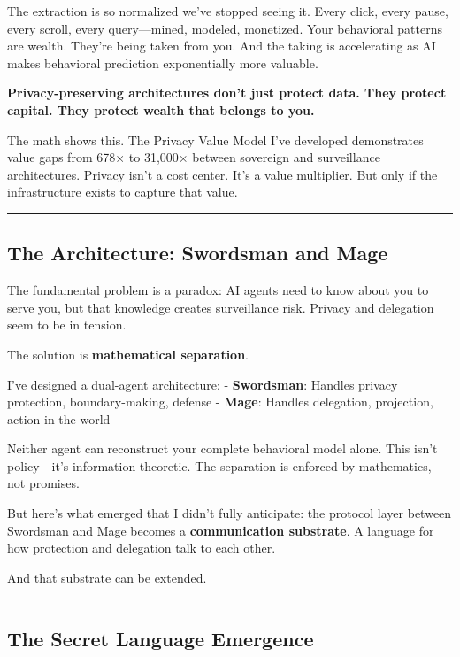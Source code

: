 \documentclass[
]{article}
\begin{document}
The extraction is so normalized we've stopped seeing it. Every click,
every pause, every scroll, every query---mined, modeled, monetized. Your
behavioral patterns are wealth. They're being taken from you. And the
taking is accelerating as AI makes behavioral prediction exponentially
more valuable.

\textbf{Privacy-preserving architectures don't just protect data. They
protect capital. They protect wealth that belongs to you.}

The math shows this. The Privacy Value Model I've developed demonstrates
value gaps from 678× to 31,000× between sovereign and surveillance
architectures. Privacy isn't a cost center. It's a value multiplier. But
only if the infrastructure exists to capture that value.

\begin{center}\rule{0.5\linewidth}{0.5pt}\end{center}

\subsection{The Architecture: Swordsman and
Mage}\label{the-architecture-swordsman-and-mage}

The fundamental problem is a paradox: AI agents need to know about you
to serve you, but that knowledge creates surveillance risk. Privacy and
delegation seem to be in tension.

The solution is \textbf{mathematical separation}.

I've designed a dual-agent architecture: - \textbf{Swordsman}: Handles
privacy protection, boundary-making, defense - \textbf{Mage}: Handles
delegation, projection, action in the world

Neither agent can reconstruct your complete behavioral model alone. This
isn't policy---it's information-theoretic. The separation is enforced by
mathematics, not promises.

But here's what emerged that I didn't fully anticipate: the protocol
layer between Swordsman and Mage becomes a \textbf{communication
substrate}. A language for how protection and delegation talk to each
other.

And that substrate can be extended.

\begin{center}\rule{0.5\linewidth}{0.5pt}\end{center}

\subsection{The Secret Language
Emergence}\label{the-secret-language-emergence}
\end{document}
